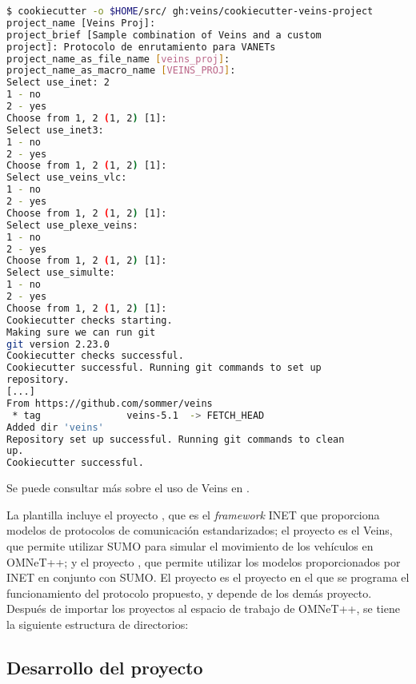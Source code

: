 \begin{lstlisting}[language=bash]
$ cookiecutter -o $HOME/src/ gh:veins/cookiecutter-veins-project
project_name [Veins Proj]:
project_brief [Sample combination of Veins and a custom
project]: Protocolo de enrutamiento para VANETs
project_name_as_file_name [veins_proj]:
project_name_as_macro_name [VEINS_PROJ]:
Select use_inet: 2
1 - no
2 - yes
Choose from 1, 2 (1, 2) [1]:
Select use_inet3:
1 - no
2 - yes
Choose from 1, 2 (1, 2) [1]:
Select use_veins_vlc:
1 - no
2 - yes
Choose from 1, 2 (1, 2) [1]:
Select use_plexe_veins:
1 - no
2 - yes
Choose from 1, 2 (1, 2) [1]:
Select use_simulte:
1 - no
2 - yes
Choose from 1, 2 (1, 2) [1]:
Cookiecutter checks starting.
Making sure we can run git
git version 2.23.0
Cookiecutter checks successful.
Cookiecutter successful. Running git commands to set up
repository.
[...]
From https://github.com/sommer/veins
 * tag               veins-5.1  -> FETCH_HEAD
Added dir 'veins'
Repository set up successful. Running git commands to clean
up.
Cookiecutter successful.
\end{lstlisting}

Se puede consultar más sobre el uso de Veins en \cite{TutorialVeins}.

La plantilla incluye el proyecto , que es el \textit{framework} INET
que proporciona modelos de protocolos de comunicación estandarizados; el
proyecto  es el  Veins, que permite utilizar SUMO
para simular el movimiento de los vehículos en OMNeT++; y el proyecto
, que permite utilizar los modelos proporcionados por INET en
conjunto con SUMO. El proyecto  es el proyecto en el que se
programa el funcionamiento del protocolo propuesto, y depende de los demás
proyecto. Después de importar los proyectos al espacio de trabajo de OMNeT++,
se tiene la siguiente estructura de directorios:



\subsection{Desarrollo del proyecto}

\label{subsec:desarrollo_proyecto}

